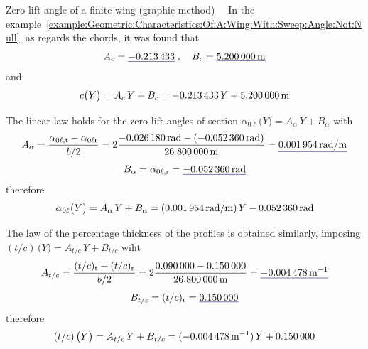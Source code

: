 \documentclass[[12pt,twoside]{book}
\begin{document}
\begin{myExampleX}{Zero lift angle of a finite wing (graphic method)}{\ \myIconGraph\ }
In the example~\ref{example:Geometric:Characteristics:Of:A:Wing:With:Sweep:Angle:Not:Null}, as regards the chords, it was found that
\[
A_c
  = \mathunderline{mydarkblue}{ \SI[round-precision=3]{\myCoeffAChordWing}{} }
\;,\quad
B_c
  = \mathunderline{mydarkblue}{ \SI[round-precision=2]{\myCoeffBChordWingMT}{\metre} }
\]
and
\[
c \big( Y \big) = A_c \, Y + B_c
  = \SI[round-precision=3]{\myCoeffAChordWing}{} \, Y
    + \SI[round-precision=2]{\myCoeffBChordWingMT}{\metre}
\]

The linear law holds for the  zero lift angles of section $\alpha_{0\ell} \big( Y \big) = A_{\alpha} \, Y + B_{\alpha}$ 
with
\[
A_{\alpha}
  = \frac{\alpha_{0\ell,\mathrm{t}} - \alpha_{0\ell\mathrm{r}}}{b/2}
  = 
    2 \frac{
      \SI[round-precision=4]{\myAlphaZeroLiftTipWingRAD}{\radian} 
        - ( \SI[round-precision=4]{\myAlphaZeroLiftRootWingRAD}{\radian} )
    }{
      \SI[round-precision=2]{\mySpanWingMT}{\metre}
    }
  = \mathunderline{mydarkblue}{ \SI[round-precision=5]{\myCoeffAAeroTwistWingRADMT}{\radian/\metre} }
\]
\[
B_{\alpha}
  = \alpha_{0\ell,\mathrm{r}}
  = \mathunderline{mydarkblue}{ \SI[round-precision=4]{\myAlphaZeroLiftRootWingRAD}{\radian} }
\]
therefore
\[
\alpha_{0\ell} \big( Y \big) = A_{\alpha} \, Y + B_{\alpha}
  = (\SI[round-precision=5]{\myCoeffAAeroTwistWingRADMT}{\radian/\metre}) \, Y
    \SI[round-precision=4]{\myAlphaZeroLiftRootWingRAD}{\radian}
\]

The law of the percentage thickness of the profiles is obtained similarly,
imposing
$(t/c)\,\big( Y \big) = A_{t/c} \, Y + B_{t/c}$ 
wiht
\[
A_{t/c}
  = \frac{(t/c)_{\mathrm{t}} - (t/c)_{\mathrm{r}}}{b/2}
  = 
    2 \frac{
      \SI[round-precision=2]{\myThicknessOverChordTipWing}{} 
        - \SI[round-precision=4]{\myThicknessOverChordRootWing}{}
    }{
      \SI[round-precision=2]{\mySpanWingMT}{\metre}
    }
  = \mathunderline{mydarkblue}{ \SI[round-precision=5]{\myCoeffAPercThicknessWingMT}{\metre^{-1}} }
\]
\[
B_{t/c}
  = (t/c)_{\mathrm{r}}
  = \mathunderline{mydarkblue}{ \SI[round-precision=2]{\myCoeffBPercThicknessWing}{} }
\]
therefore
\[
(t/c)\,\big( Y \big) = A_{t/c} \, Y + B_{t/c}
  = (\SI[round-precision=5]{\myCoeffAPercThicknessWingMT}{\metre^{-1}}) \, Y
    + \SI[round-precision=2]{\myCoeffBPercThicknessWing}{}
\]


\end{myExampleX}
\end{document}
